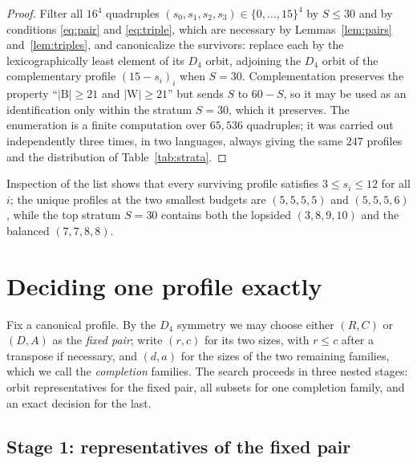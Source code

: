 \documentclass[11pt]{amsart}
\theoremstyle{remark}
\newcommand{\Bl}{\mathrm{B}}
\newcommand{\Wh}{\mathrm{W}}
\begin{document}
\begin{proof}
Filter all $16^4$ quadruples $(s_0,s_1,s_2,s_3)\in\{0,\dots,15\}^4$ by $S\le 30$ and by conditions \eqref{eq:pair} and \eqref{eq:triple}, which are necessary by Lemmas~\ref{lem:pairs} and~\ref{lem:triples}, and canonicalize the survivors: replace each by the lexicographically least element of its $D_4$ orbit, adjoining the $D_4$ orbit of the complementary profile $(15-s_i)_i$ when $S=30$. Complementation preserves the property ``$|\Bl|\ge21$ and $|\Wh|\ge21$'' but sends $S$ to $60-S$, so it may be used as an identification only within the stratum $S=30$, which it preserves. The enumeration is a finite computation over $65{,}536$ quadruples; it was carried out independently three times, in two languages, always giving the same $247$ profiles and the distribution of Table~\ref{tab:strata}.
\end{proof}

Inspection of the list shows that every surviving profile satisfies $3\le s_i\le 12$ for all $i$; the unique profiles at the two smallest budgets are $(5,5,5,5)$ and $(5,5,5,6)$, while the top stratum $S=30$ contains both the lopsided $(3,8,9,10)$ and the balanced $(7,7,8,8)$.

\section{Deciding one profile exactly}\label{sec:completion}

Fix a canonical profile. By the $D_4$ symmetry we may choose either $(R,C)$ or $(D,A)$ as the \emph{fixed pair}; write $(r,c)$ for its two sizes, with $r\le c$ after a transpose if necessary, and $(d,a)$ for the sizes of the two remaining families, which we call the \emph{completion} families. The search proceeds in three nested stages: orbit representatives for the fixed pair, all subsets for one completion family, and an exact decision for the last.

\subsection*{Stage 1: representatives of the fixed pair}
\end{document}

